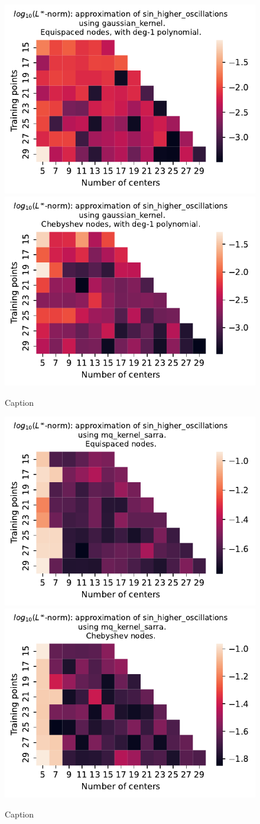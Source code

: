 \documentclass[12pt]{report} %
\begin{document}
\begin{figure}[ht]
  \centering

  \includegraphics[width=.49\textwidth]{imagenes/experiments/1d/variational/sin_higher_oscillations-Kgaussian_kernel-Poly-Equi.pdf}
  \includegraphics[width=.49\textwidth]{imagenes/experiments/1d/variational/sin_higher_oscillations-Kgaussian_kernel-Poly-Cheb.pdf}
  \caption{Caption}
  \label{fig:sin-higher-oscillations-gaussian-poly}
\end{figure}

\begin{figure}[ht]
  \centering

  \includegraphics[width=.49\textwidth]{imagenes/experiments/1d/variational/sin_higher_oscillations-Kmq_kernel_sarra-Equi.pdf}
  \includegraphics[width=.49\textwidth]{imagenes/experiments/1d/variational/sin_higher_oscillations-Kmq_kernel_sarra-Cheb.pdf}
  \caption{Caption}
  \label{fig:sin-higher-oscillations-sarra}
\end{figure}
\end{document}
